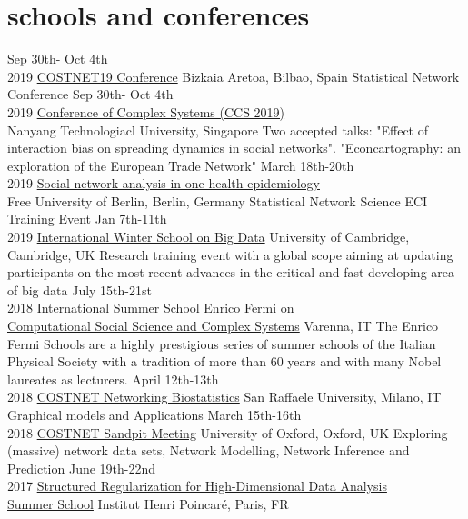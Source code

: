\documentclass[]{cv-style}     %
\begin{document}
\section{schools and conferences}
\begin{entrylist}
\entry
{Sep 30th- Oct 4th\\2019}
{\href{https://costnetbilbao.wordpress.com/}{COSTNET19 Conference}}
{Bizkaia Aretoa, Bilbao, Spain}
{Statistical Network Conference}
\entry
{Sep 30th- Oct 4th\\2019}
{\href{http://event.ntu.edu.sg/ccs2019/Pages/Home.aspx}{Conference of Complex Systems (CCS 2019)}\\}
{Nanyang Technologiacl University, Singapore}
{Two accepted talks: "Effect of interaction bias on spreading dynamics in social networks". "Econcartography:  an exploration of the European Trade Network"}
\entry
{March 18th-20th\\2019}
{\href{https://www.vetmed.fu-berlin.de/en/einrichtungen/institute/we16/aus_und_weiterbildung/snaworkshop/index.html}{Social network analysis in one health epidemiology\\}}
{Free University of Berlin, Berlin, Germany}
{Statistical Network Science ECI Training Event}
\entry
{Jan 7th-11th\\2019}
{\href{http://bigdat2019.irdta.eu/}{International Winter School on Big Data}}
{University of Cambridge, Cambridge, UK}
{Research training event with a global scope aiming at updating participants on the most recent advances in the critical and fast developing area of big data}
\entry
{July 15th-21st\\2018}
{\href{https://sites.google.com/view/varennacs2018}{International Summer School Enrico Fermi on\\Computational Social Science and Complex Systems}}
{Varenna, IT}
{The Enrico Fermi Schools are a highly prestigious series of summer schools of the Italian Physical Society with a tradition of more than 60 years and with many Nobel laureates as lecturers.}
\entry
{April 12th-13th\\2018}
{\href{http://ibs-italy.org/?page_id=703&lang=en}{COSTNET Networking Biostatistics}}
{San Raffaele University, Milano, IT}
{Graphical models and Applications}
\entry
{March 15th-16th\\2018}
{\href{https://www.oxforduniversitystores.co.uk/conferences-events/statistics/statistics/costnet-sandpit-meeting}{COSTNET Sandpit Meeting}}
{University of Oxford, Oxford, UK}
{Exploring (massive) network data sets, Network Modelling, Network Inference and Prediction}
\entry
{June 19th-22nd\\2017}
{\href{https://regularize-in-paris.github.io/}{Structured Regularization for High-Dimensional Data Analysis\\Summer School}}
{Institut Henri Poincaré, Paris, FR}
{}
\end{entrylist}
\end{document}
